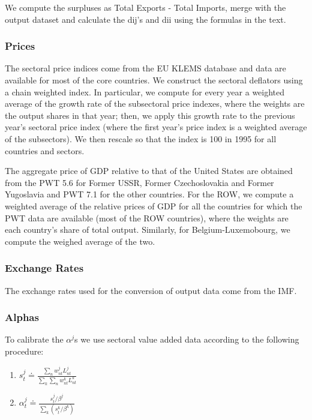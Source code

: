 \documentclass[12pt]{article}
\begin{document}
We compute the surpluses as Total Exports - Total Imports, merge with the
output dataset and calculate the dij's and dii using the formulas in the
text.

\subsubsection{Prices}

The sectoral price indices come from the EU KLEMS database and data are
available for most of the core countries. We construct the sectoral
deflators using a chain weighted index. In particular, we compute for every
year a weighted average of the growth rate of the subsectoral price indexes,
where the weights are the output shares in that year; then, we apply this
growth rate to the previous year's sectoral price index (where the first
year's price index is a weighted average of the subsectors). We then rescale
so that the index is 100 in 1995 for all countries and sectors.

The aggregate price of GDP relative to that of the United States are
obtained from the PWT 5.6 for Former USSR, Former Czechoslovakia and Former
Yugoslavia and PWT 7.1 for the other countries. For the ROW, we compute a
weighted average of the relative prices of GDP for all the countries for
which the PWT data are available (most of the ROW countries), where the
weights are each country's share of total output. Similarly, for
Belgium-Luxemobourg, we compute the weighed average of the two.

\subsubsection{Exchange Rates}

The exchange rates used for the conversion of output data come from the IMF.

\subsubsection{Alphas}

To calibrate the $\alpha^{j}$s we use sectoral value added data according to
the following procedure:

\begin{enumerate}
\item $s^j_{t} \doteq \frac{\sum_n w^j_{nt} L^j_{nt}}{\sum_k \sum_n w^k_{nt}
L^k_{nt}}$

\item $\alpha^j_t \doteq \frac{s^j_{t} / \beta^j}{\sum_k (s^k_{t} / \beta^k)}
$
\end{enumerate}
\end{document}
